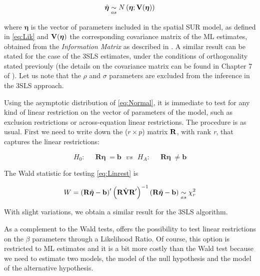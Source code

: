 \documentclass[article]{jss}
\begin{document}
\begin{equation}
\hat{{\boldsymbol \eta}} \underset{as}{\sim}  N \left({\boldsymbol \eta}; {\bf V}({\boldsymbol \eta}) \right)
\label{eq:Normal}
\end{equation}

where \({\boldsymbol \eta}\) is the vector of parameters included in the spatial SUR model, as defined in \eqref{eq:Lik} and \({\bf V}({\boldsymbol \eta})\) the corresponding covariance matrix of the ML estimates, obtained from the \emph{Information Matrix} as described in \citet{Lopez2014}. A similar result can be stated for the case of the 3SLS estimates, under the conditions of orthogonality stated previouly (the details on the covariance matrix can be found in Chapter 7 of \citet{Wooldridge2010}). Let us note that the \(\rho\) and \(\sigma\) parameters are excluded from the inference in the 3SLS approach.

Using the asymptotic distribution of \eqref{eq:Normal}, it is immediate to test for any kind of linear restriction on the vector of parameters of the model, such as exclusion restrictions or across-equation linear restrictions. The procedure is as usual. First we need to write down the (\(r \times p\)) matrix \(\bf R\), with rank \emph{r}, that captures the linear restrictions:

\begin{equation}
 H_0:\, \mathop{\ \ \ \textbf{R} {\boldsymbol \eta}} = \textbf{b} \ \ \ \textit{vs} \ \ \ H_{A} :\, \mathop{\ \ \ \textbf{R} {\boldsymbol \eta}} \neq  \textbf{b}
 \label{eq:Linrest}
 \end{equation}

The Wald statistic for testing \eqref{eq:Linrest} is

\begin{equation}
W = \left( \textbf{R} \hat{{\boldsymbol \eta}} -  \textbf{b} \right)' \left(\textbf{R} \hat{{\bf V}}\textbf{R}'\right)^{-1} \left(\textbf{R}\hat{{\boldsymbol \eta}} -  \textbf{b} \right)  \underset{as}{\sim} \chi_r^2
\label{eq:Waldlin}
\end{equation}

With slight variations, we obtain a similar result for the 3SLS algorithm.

As a complement to the Wald tests,  offers the possibility to test linear restrictions on the \(\beta\) parameters through a Likelihood Ratio. Of course, this option is restricted to ML estimates and it is a bit more costly than the Wald test because we need to estimate two models, the model of the null hypothesis and the model of the alternative hypothesis.
\end{document}
